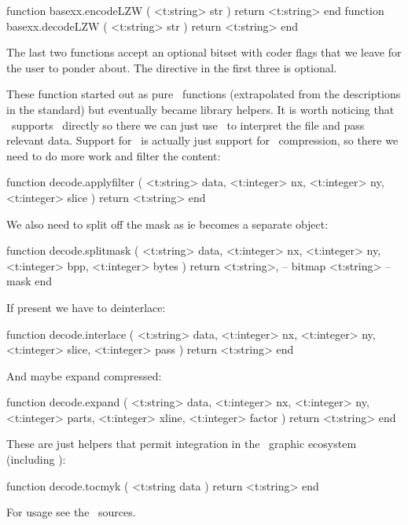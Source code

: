 function basexx.encodeLZW ( <t:string> str ) return <t:string> end
function basexx.decodeLZW ( <t:string> str ) return <t:string> end
\stoptyping

The last two functions accept an optional bitset with coder flags that we leave
for the user to ponder about. The  directive in the first three is
optional.

\stopsubsection

\startsubsection[title=\PNG\ decoding]

These function started out as pure \LUA\ functions (extrapolated from the
descriptions in the standard) but eventually became library helpers. It is
worth noticing that \PDF\ supports \JPEG\ directly so there we can just use
\LUA\ to interpret the file and pass relevant data. Support for \PNG\ is
actually just support for \PNG\ compression, so there we need to do more
work and filter the content:

\starttyping[option=LUA]
function decode.applyfilter (
    <t:string>  data,
    <t:integer> nx,
    <t:integer> ny,
    <t:integer> slice
)
    return <t:string>
end
\stoptyping

We also need to split off the mask as ie becomes a separate object:

\starttyping[option=LUA]
function decode.splitmask (
    <t:string>  data,
    <t:integer> nx,
    <t:integer> ny,
    <t:integer> bpp,
    <t:integer> bytes
)
    return
        <t:string>, -- bitmap
        <t:string>  -- mask
end
\stoptyping

If present we have to deinterlace:

\starttyping[option=LUA]
function decode.interlace (
    <t:string>  data,
    <t:integer> nx,
    <t:integer> ny,
    <t:integer> slice,
    <t:integer> pass
)
    return <t:string>
end
\stoptyping

And maybe expand compressed:

\starttyping[option=LUA]
function decode.expand (
    <t:string>  data,
    <t:integer> nx,
    <t:integer> ny,
    <t:integer> parts,
    <t:integer> xline,
    <t:integer> factor
)
    return <t:string>
end
\stoptyping

These are just helpers that permit integration in the \CONTEXT\ graphic
ecosystem (including \METAPOST):

\starttyping[option=LUA]
function decode.tocmyk ( <t:string data )
    return <t:string>
end
\stoptyping

For usage see the \CONTEXT\ sources.

